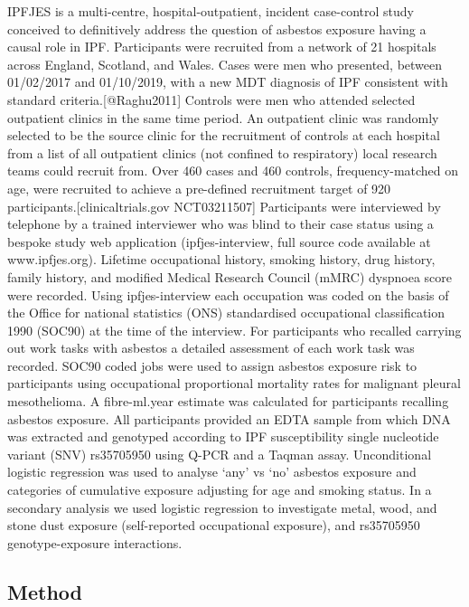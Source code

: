 \documentclass[
]{article}
\begin{document}
IPFJES is a multi-centre, hospital-outpatient, incident case-control
study conceived to definitively address the question of asbestos
exposure having a causal role in IPF. Participants were recruited from a
network of 21 hospitals across England, Scotland, and Wales. Cases were
men who presented, between 01/02/2017 and 01/10/2019, with a new MDT
diagnosis of IPF consistent with standard criteria.{[}@Raghu2011{]}
Controls were men who attended selected outpatient clinics in the same
time period. An outpatient clinic was randomly selected to be the source
clinic for the recruitment of controls at each hospital from a list of
all outpatient clinics (not confined to respiratory) local research
teams could recruit from. Over 460 cases and 460 controls,
frequency-matched on age, were recruited to achieve a pre-defined
recruitment target of 920 participants.{[}clinicaltrials.gov
NCT03211507{]} Participants were interviewed by telephone by a trained
interviewer who was blind to their case status using a bespoke study web
application (ipfjes-interview, full source code available at
www.ipfjes.org). Lifetime occupational history, smoking history, drug
history, family history, and modified Medical Research Council (mMRC)
dyspnoea score were recorded. Using ipfjes-interview each occupation was
coded on the basis of the Office for national statistics (ONS)
standardised occupational classification 1990 (SOC90) at the time of the
interview. For participants who recalled carrying out work tasks with
asbestos a detailed assessment of each work task was recorded. SOC90
coded jobs were used to assign asbestos exposure risk to participants
using occupational proportional mortality rates for malignant pleural
mesothelioma. A fibre-ml.year estimate was calculated for participants
recalling asbestos exposure. All participants provided an EDTA sample
from which DNA was extracted and genotyped according to IPF
susceptibility single nucleotide variant (SNV) rs35705950 using Q-PCR
and a Taqman assay. Unconditional logistic regression was used to
analyse `any' vs `no' asbestos exposure and categories of cumulative
exposure adjusting for age and smoking status. In a secondary analysis
we used logistic regression to investigate metal, wood, and stone dust
exposure (self-reported occupational exposure), and rs35705950
genotype-exposure interactions.

\hypertarget{method-3}{%
\subsection{Method}\label{method-3}}
\end{document}
